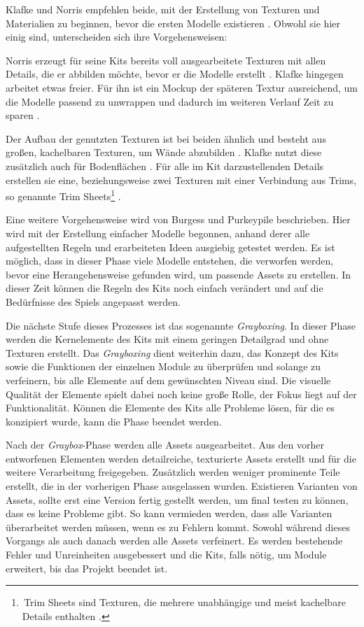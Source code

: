 \par
Klafke und Norris empfehlen beide, mit der Erstellung von Texturen und Materialien zu beginnen, bevor die ersten Modelle existieren \parencite{Klafke,Norris}. Obwohl sie hier einig sind, unterscheiden sich ihre Vorgehensweisen:
\par
Norris erzeugt für seine Kits bereits voll ausgearbeitete Texturen mit allen Details, die er abbilden möchte, bevor er die Modelle erstellt  \parencite{Norris}. Klafke hingegen arbeitet etwas freier. Für ihn ist ein Mockup der späteren Textur ausreichend, um die Modelle passend zu unwrappen und dadurch im weiteren Verlauf Zeit zu sparen \parencite{Klafke}.
\par
Der Aufbau der genutzten Texturen ist bei beiden ähnlich und besteht aus großen, kachelbaren Texturen, um Wände abzubilden \parencite{Klafke,Norris}. Klafke nutzt diese zusätzlich auch für Bodenflächen \parencite{Klafke}. Für alle im Kit darzustellenden Details erstellen sie eine, beziehungsweise zwei Texturen mit einer Verbindung aus Trims, so genannte Trim Sheets\footnote{\,Trim Sheets sind Texturen, die mehrere unabhängige und meist kachelbare Details enthalten \parencite{Meler}.} \parencite{Klafke,Norris}.
\par
Eine weitere Vorgehensweise wird von Burgess und Purkeypile beschrieben. Hier wird mit der Erstellung einfacher Modelle begonnen, anhand derer alle aufgestellten Regeln und erarbeiteten Ideen ausgiebig getestet werden. Es ist möglich, dass in dieser Phase viele Modelle entstehen, die verworfen werden, bevor eine Herangehensweise gefunden wird, um passende Assets zu erstellen. In dieser Zeit können die Regeln des Kits noch einfach verändert  und auf die Bedürfnisse des Spiels angepasst werden. \parencite{Burgess}
\par
Die nächste Stufe dieses Prozesses ist das sogenannte \textit{Grayboxing}. In dieser Phase werden die Kernelemente des Kits mit einem geringen Detailgrad und ohne Texturen erstellt. Das \textit{Grayboxing} dient weiterhin dazu, das Konzept des Kits sowie die Funktionen der einzelnen Module zu überprüfen und solange zu verfeinern, bis alle Elemente auf dem gewünschten Niveau sind. Die visuelle Qualität der Elemente spielt dabei noch keine große Rolle, der Fokus liegt auf der Funktionalität. Können die Elemente des Kits alle Probleme lösen, für die es konzipiert wurde, kann die Phase beendet werden. \parencite{Burgess}
\par
Nach der \textit{Graybox}-Phase werden alle Assets ausgearbeitet. Aus den vorher entworfenen Elementen werden detailreiche, texturierte Assets erstellt und für die weitere Verarbeitung freigegeben. Zusätzlich werden weniger prominente Teile erstellt, die in der vorherigen Phase ausgelassen wurden. Existieren Varianten von Assets, sollte erst eine Version fertig gestellt werden, um final testen zu können, dass es keine Probleme gibt. So kann vermieden werden, dass alle Varianten überarbeitet werden müssen, wenn es zu Fehlern kommt. Sowohl während dieses Vorgangs als auch danach werden alle Assets verfeinert. Es werden bestehende Fehler und Unreinheiten ausgebessert und die Kits, falls nötig, um Module erweitert, bis das Projekt beendet ist. \parencite{Burgess}
